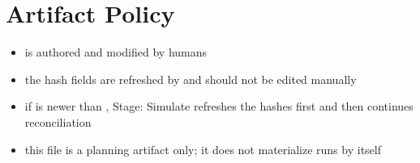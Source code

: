 \documentclass[11pt]{article}
\begin{document}
\section*{Artifact Policy}

\begin{itemize}
\item {} is authored and modified by humans
\item the hash fields are refreshed by  and should not be edited manually
\item if  is newer than , Stage: Simulate refreshes the hashes first and then continues reconciliation
\item this file is a planning artifact only; it does not materialize runs by itself
\end{itemize}
\end{document}
